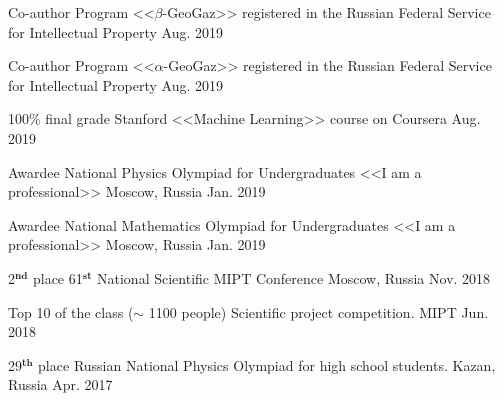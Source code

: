 
\begin{cvhonors}
    
  \cvhonor
    {Co-author} %
    {Program <<$\beta$-GeoGaz>> registered in the Russian Federal Service for Intellectual Property} %
    {} %
    {Aug. 2019} %
            
  \cvhonor
    {Co-author} %
    {Program <<$\alpha$-GeoGaz>> registered in the Russian Federal Service for Intellectual Property} %
    {} %
    {Aug. 2019} %
    
  \cvhonor
    {100\% final grade} %
    {Stanford <<Machine Learning>> course on Coursera} %
    {} %
    {Aug. 2019} %
    
  \cvhonor
    {Awardee} %
    {National Physics Olympiad for Undergraduates <<I am a professional>>} %
    {Moscow, Russia} %
    {Jan. 2019} %
    
    
  \cvhonor
    {Awardee} %
    {National Mathematics Olympiad for Undergraduates <<I am a professional>>} %
    {Moscow, Russia} %
    {Jan. 2019} %
    
  \cvhonor
    {2$^{\textbf{nd}}$ place} %
    {61$^{\textbf{st}}$ National Scientific MIPT Conference} %
    {Moscow, Russia} %
    {Nov. 2018} %
    
  \cvhonor
    {Top 10 of the class ($\sim$ 1100 people)} %
    {Scientific project competition.} %
    {MIPT} %
    {Jun. 2018} %

  \cvhonor
    {29$^{\textbf{th}}$ place} %
    {Russian National Physics Olympiad for high school students.} %
    {Kazan, Russia} %
    {Apr. 2017} %
	
\end{cvhonors}
